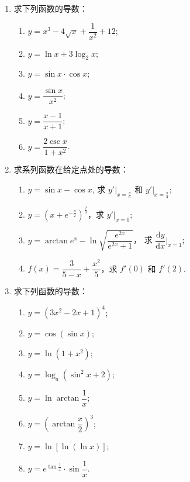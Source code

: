 \begin{enumerate}\setlength{\itemsep}{7pt}
    \item 求下列函数的导数：
    \begin{enumerate}[(1)]\setlength{\itemsep}{5pt}\setlength{\topsep}{15pt}
        \item $y=x^3-4\sqrt{x}+\dfrac{1}{x^2}+12$;
        \item $y=\ln x+3\log_2x$;
        \item $y=\sin x\cdot \cos x$;
        \item $y=\dfrac{\sin x}{x^2}$;
        \item $y=\dfrac{x-1}{x+1}$;
        \item $y=\dfrac{2\csc x}{1+x^2}$.
    \end{enumerate}

    \item 求系列函数在给定点处的导数：
    \begin{enumerate}[(1)]\setlength{\itemsep}{5pt}\setlength{\topsep}{15pt}
        \item $y=\sin x-\cos x$, 求 $y'\big|_{x=\frac{\pi}{6}}$ 和 $y'\big|_{x=\frac{\pi}{4}}$;
        \item $y=(x+e^{-\frac{\pi}{2}})^{\frac{2}{3}}$，求 $y'\big|_{x=0}$;
        \item $y=\arctan e^{x}-\ln\sqrt{\dfrac{e^{2x}}{e^{2x}+1}}$，
        求 $\dfrac{\text{d}y}{\text{d}x}\bigg|_{x=1}$;
        \item $f(x)=\dfrac{3}{5-x}+\dfrac{x^2}{5}$，求 $f'(0)$ 和 $f'(2)$.
    \end{enumerate}

    \item 求下列函数的导数：
    \begin{enumerate}[(1)]\setlength{\itemsep}{5pt}\setlength{\topsep}{15pt}
        \item $y=(3x^2-2x+1)^4$;
        \item $y=\cos(\sin x)$;
        \item $y=\ln(1+x^2)$;
        \item $y=\log_a(\sin^2x+2)$;
        \item $y=\ln\arctan\dfrac{1}{x}$;
        \item $y=\left(\arctan\dfrac{x}{2}\right)^3$;
        \item $y=\ln[\ln(\ln x)]$;
        \item $y=e^{\tan\frac{1}{x}}\cdot\sin\dfrac{1}{x}$.
    \end{enumerate}


\end{enumerate}

